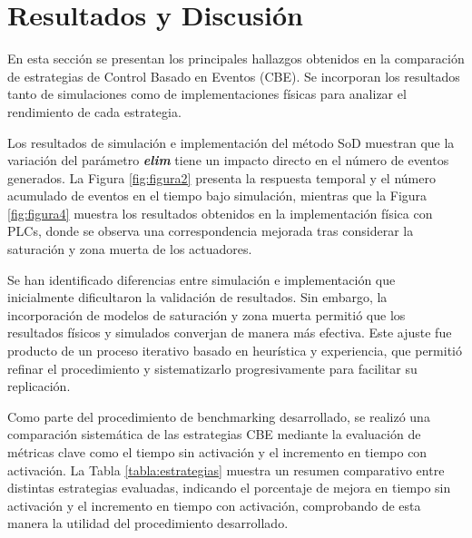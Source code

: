 \documentclass[conference]{IEEEtran}
\begin{document}
\begin{table}[h]
    \centering
    \caption{Comparación de Estrategias de Control Basado en Eventos}
    \label{tabla:estrategias}
\end{table}

\section{Resultados y Discusión}
En esta sección se presentan los principales hallazgos obtenidos en la comparación de estrategias de Control Basado en Eventos (CBE). Se incorporan los resultados tanto de simulaciones como de implementaciones físicas para analizar el rendimiento de cada estrategia.

Los resultados de simulación e implementación del método SoD muestran que la variación del parámetro \textbf{\textit{elim}} tiene un impacto directo en el número de eventos generados. La Figura \ref{fig:figura2} presenta la respuesta temporal y el número acumulado de eventos en el tiempo bajo simulación, mientras que la Figura \ref{fig:figura4} muestra los resultados obtenidos en la implementación física con PLCs, donde se observa una correspondencia mejorada tras considerar la saturación y zona muerta de los actuadores.

Se han identificado diferencias entre simulación e implementación que inicialmente dificultaron la validación de resultados. Sin embargo, la incorporación de modelos de saturación y zona muerta permitió que los resultados físicos y simulados converjan de manera más efectiva. Este ajuste fue producto de un proceso iterativo basado en heurística y experiencia, que permitió refinar el procedimiento y sistematizarlo progresivamente para facilitar su replicación.

Como parte del procedimiento de benchmarking desarrollado, se realizó una comparación sistemática de las estrategias CBE mediante la evaluación de métricas clave como el tiempo sin activación y el incremento en tiempo con activación. La Tabla \ref{tabla:estrategias} muestra un resumen comparativo entre distintas estrategias evaluadas, indicando el porcentaje de mejora en tiempo sin activación y el incremento en tiempo con activación, comprobando de esta manera la utilidad del procedimiento desarrollado.
\end{document}
